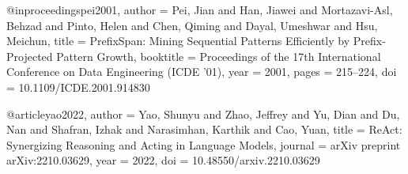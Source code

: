 @inproceedings{pei2001,
  author    = {Pei, Jian and Han, Jiawei and Mortazavi-Asl, Behzad and
               Pinto, Helen and Chen, Qiming and Dayal, Umeshwar and
               Hsu, Meichun},
  title     = {{PrefixSpan}: Mining Sequential Patterns Efficiently by
               Prefix-Projected Pattern Growth},
  booktitle = {Proceedings of the 17th International Conference on
               Data Engineering (ICDE '01)},
  year      = {2001},
  pages     = {215--224},
  doi       = {10.1109/ICDE.2001.914830}
}

@article{yao2022,
  author  = {Yao, Shunyu and Zhao, Jeffrey and Yu, Dian and
             Du, Nan and Shafran, Izhak and Narasimhan, Karthik
             and Cao, Yuan},
  title   = {{ReAct}: Synergizing Reasoning and Acting in
             Language Models},
  journal = {arXiv preprint arXiv:2210.03629},
  year    = {2022},
  doi     = {10.48550/arxiv.2210.03629}
}
